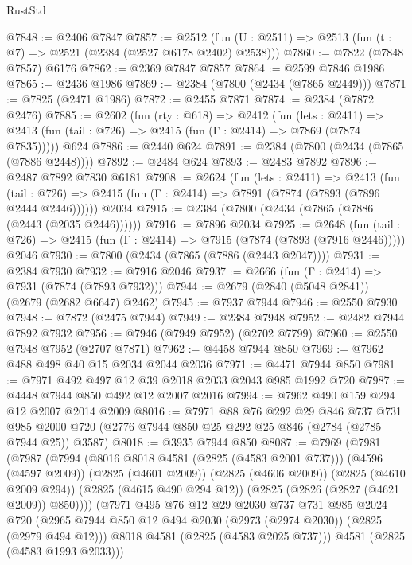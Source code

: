 \begin{lexlean}{RustStd}
\begin{coremodule}
@7848 := @2406 @7847
@7857 := @2512 (fun (U : @2511) => @2513 (fun (t : @7) => @2521 (@2384 (@2527 @6178 @2402) @2538)))
@7860 := @7822 (@7848 @7857) @6176
@7862 := @2369 @7847 @7857
@7864 := @2599 @7846 @1986
@7865 := @2436 @1986
@7869 := @2384 (@7800 (@2434 (@7865 @2449)))
@7871 := @7825 (@2471 @1986)
@7872 := @2455 @7871
@7874 := @2384 (@7872 @2476)
@7885 := @2602
    (fun (rty : @618) =>
    @2412
      (fun (lets : @2411) =>
      @2413 (fun (tail : @726) => @2415 (fun (Γ : @2414) => @7869 (@7874 @7835)))))
    @624
@7886 := @2440 @624
@7891 := @2384 (@7800 (@2434 (@7865 (@7886 @2448))))
@7892 := @2484 @624
@7893 := @2483 @7892
@7896 := @2487 @7892 @7830 @6181
@7908 := @2624
    (fun (lets : @2411) =>
    @2413
      (fun (tail : @726) => @2415 (fun (Γ : @2414) => @7891 (@7874 (@7893 (@7896 @2444 @2446))))))
    @2034
@7915 := @2384 (@7800 (@2434 (@7865 (@7886 (@2443 (@2035 @2446))))))
@7916 := @7896 @2034
@7925 := @2648
    (fun (tail : @726) => @2415 (fun (Γ : @2414) => @7915 (@7874 (@7893 (@7916 @2446)))))
    @2046
@7930 := @7800 (@2434 (@7865 (@7886 (@2443 @2047))))
@7931 := @2384 @7930
@7932 := @7916 @2046
@7937 := @2666 (fun (Γ : @2414) => @7931 (@7874 (@7893 @7932)))
@7944 := @2679 (@2840 (@5048 @2841)) (@2679 (@2682 @6647) @2462)
@7945 := @7937 @7944
@7946 := @2550 @7930
@7948 := @7872 (@2475 @7944)
@7949 := @2384 @7948
@7952 := @2482 @7944 @7892 @7932
@7956 := @7946 (@7949 @7952) (@2702 @7799)
@7960 := @2550 @7948 @7952 (@2707 @7871)
@7962 := @4458 @7944 @850
@7969 := @7962 @488 @498 @40 @15 @2034 @2044 @2036
@7971 := @4471 @7944 @850
@7981 := @7971 @492 @497 @12 @39 @2018 @2033 @2043 @985 @1992 @720
@7987 := @4448 @7944 @850 @492 @12 @2007 @2016
@7994 := @7962 @490 @159 @294 @12 @2007 @2014 @2009
@8016 := @7971
    @88
    @76
    @292
    @29
    @846
    @737
    @731
    @985
    @2000
    @720
    (@2776 @7944 @850 @25 @292 @25 @846 (@2784 (@2785 @7944 @25)) @3587)
@8018 := @3935 @7944 @850
@8087 := @7969
    (@7981
      (@7987
        (@7994
          (@8016 @8018 @4581 (@2825 (@4583 @2001 @737)))
          (@4596 (@4597 @2009))
          (@2825 (@4601 @2009))
          (@2825 (@4606 @2009))
          (@2825 (@4610 @2009 @294))
          (@2825 (@4615 @490 @294 @12))
          (@2825 (@2826 (@2827 (@4621 @2009)) @850))))
      (@7971
        @495
        @76
        @12
        @29
        @2030
        @737
        @731
        @985
        @2024
        @720
        (@2965 @7944 @850 @12 @494 @2030 (@2973 (@2974 @2030)) (@2825 (@2979 @494 @12)))
        @8018
        @4581
        (@2825 (@4583 @2025 @737)))
      @4581
      (@2825 (@4583 @1993 @2033)))

\end{coremodule}
\end{lexlean}
